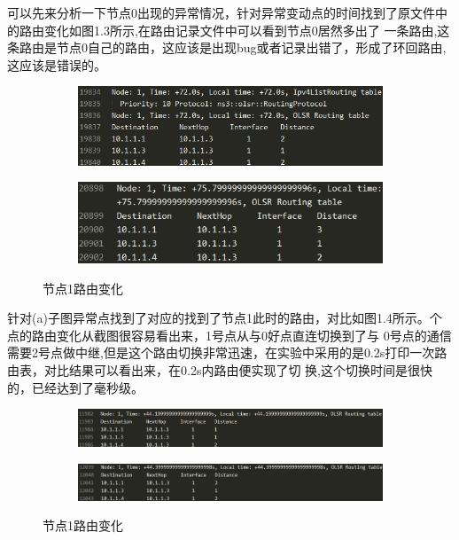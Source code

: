 \documentclass[a4paper,12pt]{report}
\begin{document}
\begin{spacing}{1.5}
可以先来分析一下节点0出现的异常情况，针对异常变动点的时间找到了原文件中的路由变化如图1.3所示,在路由记录文件中可以看到节点0居然多出了
一条路由,这条路由是节点0自己的路由，这应该是出现bug或者记录出错了，形成了环回路由,这应该是错误的。

\begin{figure}[hbtp]
	\centering
	\begin{subfigure}[t]{0.8\textwidth}
	\centering
	\includegraphics [width=1\textwidth]{figure//1-1.png}
	\end{subfigure}
	\begin{subfigure}[t]{0.8\textwidth}
	\centering
	\includegraphics [width=1\textwidth]{figure//1-2.png}
	\end{subfigure}
	\caption{节点1路由变化}\label{node1}
\end{figure}


针对(a)子图异常点找到了对应的找到了节点1此时的路由，对比如图1.4所示。个点的路由变化从截图很容易看出来，1号点从与0好点直连切换到了与
0号点的通信需要2号点做中继,但是这个路由切换非常迅速，在实验中采用的是0.2s打印一次路由表，对比结果可以看出来，在0.2s内路由便实现了切
换,这个切换时间是很快的，已经达到了毫秒级。

\begin{figure}[hbtp]
	\centering
	\begin{subfigure}[t]{0.8\textwidth}
	\centering
	\includegraphics [width=1\textwidth]{figure//2-1.png}
	\end{subfigure}
	\begin{subfigure}[t]{0.8\textwidth}
	\centering
	\includegraphics [width=1\textwidth]{figure//2-2.png}
	\end{subfigure}
	\caption{节点1路由变化}\label{node2}
\end{figure}


\end{spacing}
\end{document}

